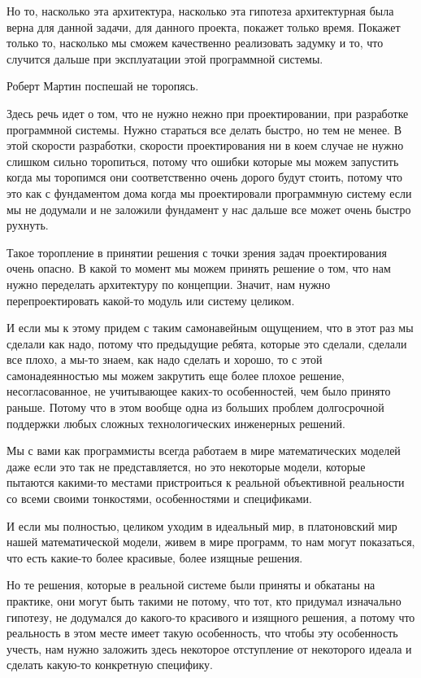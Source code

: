 Но то, насколько эта архитектура, насколько эта гипотеза архитектурная была верна для данной задачи, для данного проекта, покажет только время. Покажет только то, насколько мы сможем качественно реализовать задумку и то, что случится дальше при эксплуатации этой программной системы. 


Роберт Мартин поспешай не торопясь.

Здесь речь идет о том, что не нужно нежно при проектировании, при разработке программной системы. Нужно стараться все делать быстро, но тем не менее. В этой скорости разработки, скорости проектирования ни в коем случае не нужно слишком сильно торопиться, потому что ошибки которые мы можем запустить когда мы торопимся они соответственно очень дорого будут стоить, потому что это как с фундаментом дома когда мы проектировали программную систему если мы не додумали и не заложили фундамент у нас дальше все может очень быстро рухнуть.

Такое торопление в принятии решения с точки зрения задач проектирования очень опасно. В какой то момент мы можем принять решение о том, что нам нужно переделать архитектуру по концепции. Значит, нам нужно перепроектировать какой-то модуль или систему целиком.

И если мы к этому придем с таким самонавейным ощущением, что в этот раз мы сделали как надо, потому что предыдущие ребята, которые это сделали, сделали все плохо, а мы-то знаем, как надо сделать и хорошо, то с этой самонадеянностью мы можем закрутить еще более плохое решение, несогласованное, не учитывающее каких-то особенностей, чем было принято раньше. Потому что в этом вообще одна из больших проблем долгосрочной поддержки любых сложных технологических инженерных решений.

Мы с вами как программисты всегда работаем в мире математических моделей даже если это так не представляется, но это некоторые модели, которые пытаются какими-то местами пристроиться к реальной объективной реальности со всеми своими тонкостями, особенностями и спецификами.

И если мы полностью, целиком уходим в идеальный мир, в платоновский мир нашей математической модели, живем в мире программ, то нам могут показаться, что есть какие-то более красивые, более изящные решения.

Но те решения, которые в реальной системе были приняты и обкатаны на практике, они могут быть такими не потому, что тот, кто придумал изначально гипотезу, не додумался до какого-то красивого и изящного решения, а потому что реальность в этом месте имеет такую особенность, что чтобы эту особенность учесть, нам нужно заложить здесь некоторое отступление от некоторого идеала и сделать какую-то конкретную специфику. 

